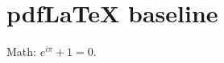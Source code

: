 \documentclass{article}
\begin{document}
\section{pdfLaTeX baseline}
Math: $e^{i\pi} + 1 = 0$.
\end{document}
